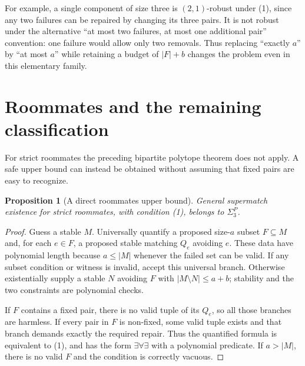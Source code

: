 \documentclass[11pt,a4paper]{article}
\newtheorem{proposition}[theorem]{Proposition}
\theoremstyle{definition}
\theoremstyle{remark}
\begin{document}
For example, a single component of size three is $(2,1)$-robust under (1), since any two failures can be repaired by changing its three pairs. It is not robust under the alternative ``at most two failures, at most one additional pair'' convention: one failure would allow only two removals. Thus replacing ``exactly $a$'' by ``at most $a$'' while retaining a budget of $|F|+b$ changes the problem even in this elementary family.

\section{Roommates and the remaining classification}
For strict roommates the preceding bipartite polytope theorem does not apply. A safe upper bound can instead be obtained without assuming that fixed pairs are easy to recognize.
\begin{proposition}[A direct roommates upper bound]
General supermatch existence for strict roommates, with condition (1), belongs to $\Sigma_3^P$.
\end{proposition}
\begin{proof}
Guess a stable $M$. Universally quantify a proposed size-$a$ subset $F\subseteq M$ and, for each $e\in F$, a proposed stable matching $Q_e$ avoiding $e$. These data have polynomial length because $a\le|M|$ whenever the failed set can be valid. If any subset condition or witness is invalid, accept this universal branch. Otherwise existentially supply a stable $N$ avoiding $F$ with $|M\setminus N|\le a+b$; stability and the two constraints are polynomial checks.

If $F$ contains a fixed pair, there is no valid tuple of its $Q_e$, so all those branches are harmless. If every pair in $F$ is non-fixed, some valid tuple exists and that branch demands exactly the required repair. Thus the quantified formula is equivalent to (1), and has the form $\exists\forall\exists$ with a polynomial predicate. If $a>|M|$, there is no valid $F$ and the condition is correctly vacuous.
\end{proof}
\end{document}
